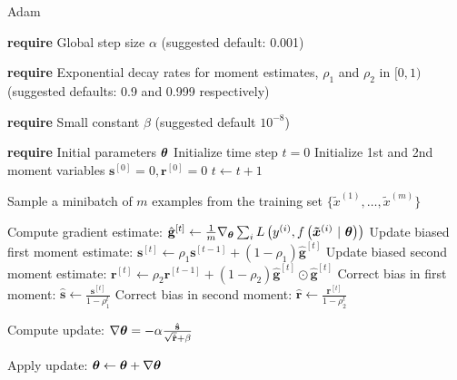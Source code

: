 \documentclass[11pt,compress,t,notes=noshow, xcolor=table]{beamer}
\begin{document}
\begin{framev}{Adam}
\begin{algorithm}[H]
\scriptsize
\caption{Adam}
\begin{algorithmic}[1]
\State \textbf{require} Global step size $\alpha$ (suggested default: 0.001) \strut
\State \parbox[t]{\dimexpr\linewidth-\algorithmicindent}{\textbf{require} Exponential decay rates for moment estimates, $\rho_1$ and $\rho_2$ in $[0,1)$ (suggested defaults: 0.9 and 0.999 respectively)} \strut
\State \parbox[t]{\dimexpr\linewidth-\algorithmicindent}{\textbf{require} Small constant $\beta$ (suggested default $10^{-8}$) \strut}
\State \textbf{require} Initial parameters $\bm{\theta}$
\State Initialize time step $t = 0$
\State Initialize 1st and 2nd moment variables $\mathbf{s}^{[0]} = 0, \mathbf{r}^{[0]} = 0$
\State $t \leftarrow t + 1$
\State \parbox[t]{\dimexpr\linewidth-\algorithmicindent}{Sample a minibatch of $m$ examples from the training set $\{\tilde{x}^{(1)},\dots,\tilde{x}^{(m)}\}$ \strut}
\State Compute gradient estimate: $\hat{\mathbf{g}}^{[t]} \leftarrow \frac{1}{m} \nabla_{\bm{\theta}} \sum_{i} L\left(y^{(i)}, f\left(\bm{\tilde{x}}^{(i)} ~|~ \bm{\theta}\right)\right)$
\State Update biased first moment estimate: $\mathbf{s}^{[t]} \leftarrow \rho_1 \mathbf{s}^{[t-1]}  + (1 - \rho_1) \hat{\mathbf{g}}^{[t]}$
\State Update biased second moment estimate: $\mathbf{r}^{[t]} \leftarrow \rho_2 \mathbf{r}^{[t-1]}  + (1 - \rho_2) \hat{\mathbf{g}}^{[t]} \odot \hat{\mathbf{g}}^{[t]}$
\State Correct bias in first moment: $\hat{\mathbf{s}} \leftarrow \frac{\mathbf{s}^{[t]} }{1-\rho_1^t}$
\State Correct bias in second moment: $\hat{\mathbf{r}} \leftarrow \frac{\mathbf{r}^{[t]} }{1-\rho_2^t}$
\State \parbox[t]{\dimexpr\linewidth-\algorithmicindent}{Compute update: $\nabla\bm{\theta} = - \alpha \frac{\hat{\mathbf{s}}}{\sqrt{\hat{\mathbf{r}}} + \beta}$ \strut}
\State Apply update: $\bm{\theta} \leftarrow \bm{\theta} + \nabla\bm{\theta}$
\EndWhile
\end{algorithmic}
\end{algorithm}
\end{framev}
\end{document}
